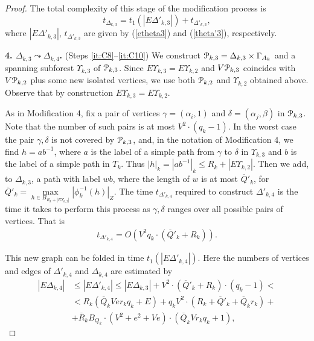 \documentclass[a4paper,12pt]{article}
\renewcommand{\a}{\alpha }
\renewcommand{\b}{\beta }
\newcommand{\G}{\Gamma }
\newcommand{\g}{\gamma }
\newcommand{\D}{\Delta }
\renewcommand{\d}{\delta }
\newcommand{\U}{\Upsilon }
\newcommand{\cP}{{\cal{P}}}
\numberwithin{equation}{section}
\numberwithin{figure}{section}
\begin{document}
\begin{proof}
The total complexity of this stage of the modification process is
\begin{equation}\label{theta3}
t_{\D_{k,3}} = t_1(|E\D'_{k,3}|)
+ t_{\D'_{k,3}},
\end{equation}
where $|E\D'_{k,3}|$, $t_{\D'_{k,3}}$ are given by (\ref{etheta3}) and
(\ref{theta'3}), respectively.


{\bf 4. $\D_{k,3} \leadsto \D_{k,4}$.} (Steps \ref{it:C8}--\ref{it:C10})
We construct $\cP_{k,3}=\D_{k,3}\times
\G_{A_k}$ and a
spanning subforest $\U_{k,3}$ of $\cP_{k,3}$. Since $E\U_{k,3} =
E\U_{k,2}$ and $V\cP_{k,3}$ coincides with $V\cP_{k,2}$ plus some new isolated
vertices, we use both $\cP_{k,2}$ and $\U_{k,2}$ obtained above. Observe that by construction $E\U_{k,3} =
E\U_{k,2}$.


As in Modification 4, fix a pair of vertices $\g=(\a_i,1)$ and
$\d=(\a_j,\b)$ in $\cP_{k,3}$. Note that the number of such pairs is
at most $V^2 \cdot (q_k-1)$. In the worst case the pair $\g, \d$ is
not covered by $\cP_{k,3}$, and, in the notation of Modification 4, we
find $h=ab^{-1}$, where $a$ is the label of a simple path from
$\g$ to $\d$ in $\U_{k,3}$ and $b$ is the label of a simple path in
$T_k$. Thus $|h|_k = |ab^{-1}|_k \le R_k+ | E\U_{k,2}|$.  Then we add,
to $\D_{k,3}$, a path with label $wb$, where the length of $w$ is
 at most $\overline{Q}'_k$, for
$\overline{Q}'_k=\max\limits_{h \in B_{R_k+|
E\U_{k,2}|}}|\phi^{-1}_k(h)|_Z$.
The time $t_{\D'_{k,4}}$ required to construct $\D'_{k,4}$ is the time
it takes to perform this process as $\g,\d$ ranges over all
possible pairs of vertices. That is
\begin{equation}\label{theta'4}
\begin{split}
t_{\D'_{k,4}} =
 O(V^2 q_k \cdot(\overline{Q}'_k+R_k)).
\end{split}
\end{equation}

This new graph can be folded in time $t_1(|E\D'_{k,4}|)$. Here the
numbers of vertices and edges of $\D'_{k,4}$ and $\D_{k,4}$ are estimated
by
\begin{equation}\label{etheta4}
\begin{split}
|E\D_{k,4}| &\le |E\D'_{k,4}| \le |E\D_{k,3}|+ V^2 \cdot (\overline{Q}'_k +
R_k)\cdot(q_k-1)<\\
&< R_k(\overline{Q}_k V e r_k q_k + E) + q_k V^2\cdot (R_k + \overline{Q}'_k + \overline{Q}_k r_k) +\\
&+ \overline{R}_k B_{Q_k} \cdot(V^2+ e^2 + Ve)\cdot(\overline{Q}_k
V r_k q_k +1),
\end{split}
\end{equation}


\end{proof}
\end{document}
